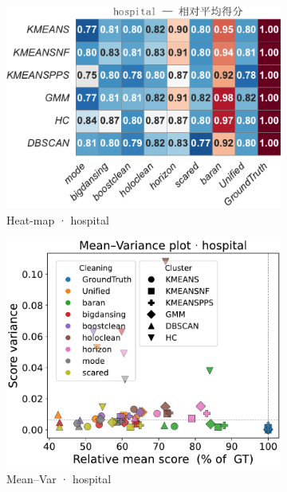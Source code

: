 \documentclass[10pt]{article} %
\numberwithin{equation}{section}
\begin{document}
\begin{figure}[htbp]
  \vspace{0.6em}
  \begin{subfigure}{0.33\linewidth}
    \centering
    \includegraphics[width=\linewidth]{figures/5.3.1graph/heatmap_rel_hospital.pdf}
    \caption{Heat-map · hospital}
  \end{subfigure}\hfill
  \begin{subfigure}{0.32\linewidth}
    \centering
    \includegraphics[width=\linewidth]{figures/5.3.1graph/mean_var_scatter_hospital.pdf}
    \caption{Mean–Var · hospital}
  \end{subfigure}\hfill
  \begin{subfigure}{0.34\linewidth}

\end{subfigure}
\end{figure}
\end{document}
